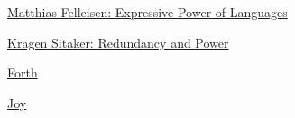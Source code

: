             
              
                
              
              
              
                \href{http://www.ccs.neu.edu/scheme/pubs/scp91-felleisen.ps.gz}{Matthias Felleisen: Expressive Power of Languages}


              
            
            
              
            
            
              
            
            
              
                
              
              
              
                \href{http://www.paulgraham.com/redund.html}{Kragen Sitaker: Redundancy and Power}


              
            
            
              
            
            
              
            
            
              
                
              
              
              
                \href{http://www.colorforth.com/}{Forth}


              
            
            
              
            
            
              
            
            
              
                
              
              
              
                \href{http://www.latrobe.edu.au/philosophy/phimvt/joy.html}{Joy}


              
            
            
              
            
            
              
            
            
              
                
              
              
              
